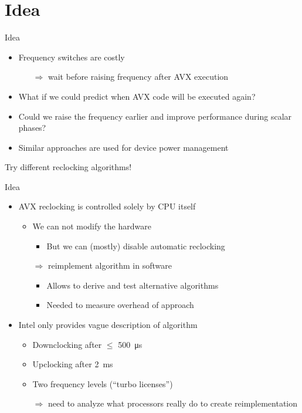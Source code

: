 \section{Idea}
\begin{frame}[t]{Idea}
	\begin{itemize}
		\item Frequency switches are costly
		\begin{itemize}
			\item[$\Rightarrow$] wait before raising frequency after AVX execution
		\end{itemize}
		\pause
		\item What if we could predict when AVX code will be executed again?
		\item Could we raise the frequency earlier and improve performance during scalar phases?
		\item Similar approaches are used for device power management
	\end{itemize}
	\pause
	\begin{center}
		\vspace{1em}
		Try different reclocking algorithms!
	\end{center}
\end{frame}

\begin{frame}[t]{Idea}
	\begin{itemize}
		\item AVX reclocking is controlled solely by CPU itself
		\begin{itemize}
			\item We can not modify the hardware
			\begin{itemize}
				\item But we can (mostly) disable automatic reclocking
			\end{itemize}
			\item[$\Rightarrow$] reimplement algorithm in software
			\begin{itemize}
				\item Allows to derive and test alternative algorithms
				\item Needed to measure overhead of approach
			\end{itemize}
		\end{itemize}
		\pause
		\item Intel only provides vague description of algorithm
		\begin{itemize}
			\item Downclocking after $\leq$ \SI{500}{\micro\second}
			\item Upclocking after \SI{2}{\milli\second}
			\item Two frequency levels (\enquote{turbo licenses})
			\item[$\Rightarrow$] need to analyze what processors really do to create reimplementation
		\end{itemize}
	\end{itemize}
\end{frame}